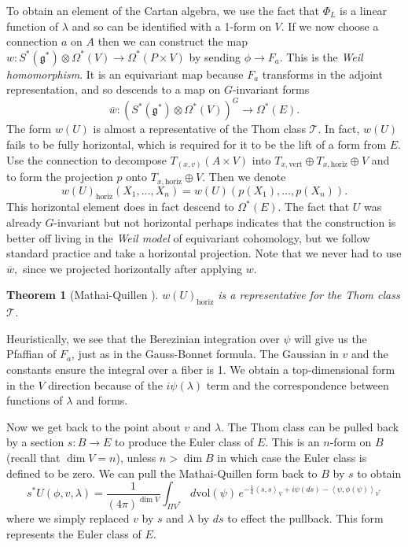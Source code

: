 \documentclass[twoside]{amsart}
\newtheorem{theorem}{Theorem}
\newcommand{\enm}[1]{\ensuremath{#1}}
\newcommand{\g}{\enm{\mathfrak{g}}}
\newcommand{\ip}[2]{\enm{\left<#1,#2\right>}}
\renewcommand{\bar}[1]{\overline{#1}}
\newcommand{\formsij}[2]{\ensuremath{\Omega^{#1}({#2})}}
\newcommand{\thom}{\enm{\mathcal{T}}}
\begin{document}
To obtain an element of the Cartan algebra, we use the fact that \(
\Phi_{L} \) is a linear function of \( \lambda \)
and so can be identified with a 1-form on \( V \).
If we now choose a connection \( a \) on \( A \) then we can construct
the map \( w:S^{*}(\g^{*})\otimes\formsij{*}{V}\to\formsij{*}{P\times
V} \) by
sending \( \phi\to F_{a} \).  This is the \emph{Weil homomorphism}.
It is an equivariant map because \( F_{a} \) transforms in the adjoint
representation, and so descends to a map on \( G \)-invariant forms
\[ \bar{w}:\left(S^{*}(\g^{*})\otimes \formsij{*}{V}\right)^{G} \to
\formsij{*}{E}. \]
The form \( w(U) \) is almost a representative of the Thom class
\thom.  In fact, \( w(U) \) fails to be fully horizontal, which is
required for it to be the lift of a form from \( E \).  Use the
connection to decompose \( T_{(x,v)}(A\times V) \) into \(
T_{x,\mathrm{vert}}\oplus T_{x,\mathrm{horiz}}\oplus V \) and to form
the projection \( p \) onto \( T_{x,\mathrm{horiz}}\oplus V. \)
Then we denote
\[ w(U)_{\mathrm{horiz}}(X_{1},\ldots,X_{n}) =
   w(U)(p(X_{1}),\ldots,p(X_{n})).\]
This horizontal element does in fact descend to \formsij{*}{E}.
The fact that \( U \) was already \( G \)-invariant but not
horizontal perhaps indicates that the construction is better off
living in the \emph{Weil model} of equivariant cohomology, but we
follow standard practice and take a horizontal projection.  Note that
we never had to use \( \bar{w}, \) since we projected horizontally
after applying \( w \).

\begin{theorem}[Mathai-Quillen \cite{mathaiquillen}] \(
    w(U)_{\mathrm{horiz}} \) is a representative for the Thom
class
    \thom.
\end{theorem}

Heuristically, we see that the Berezinian integration over \( \psi \)
will give us the Pfaffian of \( F_{a} \), just as in the Gauss-Bonnet
formula.  The Gaussian in \( v \) and the constants ensure the
integral over a fiber is 1.  We obtain a top-dimensional form in the
\( V \) direction because of the \( i\psi(\lambda) \) term and the
correspondence between functions of \( \lambda \) and forms.

Now we get back to the point about \( v \) and \( \lambda \).  The
Thom class can be pulled back by a section \( s:B\to E \) to produce
the Euler class of \( E \).  This is an \( n \)-form on \( B \)
(recall that \( \dim V = n \)), unless \( n>\dim B \) in which case
the
Euler class is defined to be zero.  We can pull the Mathai-Quillen
form back to \( B \) by \( s \) to obtain
\begin{equation}
    s^{*}U(\phi, v, \lambda) = \frac{1}{(4\pi)^{\dim V}}
\int_{\Pi
    V^{*}}d\mathrm{vol}(\psi)\,e^{-\frac{1}{4}\ip{s}{s}_{V}
    + i\psi(ds)
    - \ip{\psi}{\phi(\psi)}_{V^{*}}}
\end{equation}
where we simply replaced \( v \) by \( s \) and \( \lambda \) by \(
ds \) to effect the pullback.  This form represents the Euler class
of \( E \).
\end{document}

